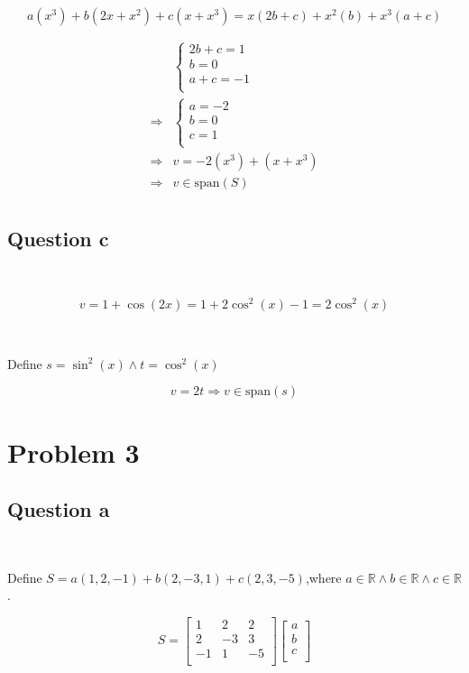 \documentclass{article}
\def\R{\mathbb{R}}
\begin{document}
$$
a(x^3)+b(2x+x^2)+c(x+x^3)=x(2b+c)+x^2(b)+x^3(a+c)
$$

\begin{equation}
\tag{2.2}
\begin{split}
&\begin{cases}
2b+c=1\\
b=0\\
a+c=-1\\
\end{cases}\\
\Rightarrow &\begin{cases}
a=-2\\
b=0\\
c=1\\
\end{cases}\\
\Rightarrow &v=-2(x^3)+(x+x^3)\\
\Rightarrow &v\in \mathrm{span}(S)\\
\end{split}
\end{equation}

\subsection{Question c}

~

$$
v = 1+\cos(2x) = 1+ 2\cos^2(x)-1 = 2\cos^2(x)
$$

~

\begin{center}
Define $s = \sin^2(x) \land t= \cos^2(x)$
\end{center}

$$
v=2t
\Rightarrow v\in \mathrm{span}(s)
$$

\newpage

\section{Problem 3}

\subsection{Question a}

~

Define $S=a(1,2,-1)+b(2,-3,1)+c(2,3,-5)$,where $a \in \R\land b\in\R\land c\in \R$.

\begin{equation}
\tag{3.1-1}
S = \begin{bmatrix}
1&2&2\\
2&-3&3\\
-1&1&-5\\
\end{bmatrix}
\begin{bmatrix}
a\\
b\\
c\\
\end{bmatrix}
\end{equation}
\end{document}
